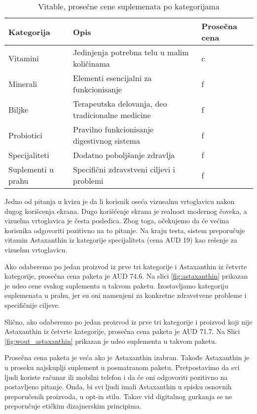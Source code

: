 \begin{table}[h!]
\small
\caption{Vitable, prosečne cene suplemenata po kategorijama}
\begin{tabular}{|l|l|l|} \hline
Kategorija& Opis & Prosečna cena\\ \hline
Vitamini &Jedinjenja potrebna telu u malim količinama&c\\ 
Minerali&Elementi esencijalni za funkcionisanje&f\\ 
Biljke&Terapeutska delovanja, deo tradicionalne medicine&f\\ 
Probiotici&Pravilno funkcionisanje digestivnog sistema&f\\ 
Specijaliteti&Dodatno poboljšanje zdravlja&f\\ 
Suplementi u prahu&Specifični zdravstveni ciljevi i problemi&f\\ \hline
\end{tabular}
\label{tab:vitablecene}
\end{table}
 Jedno od pitanja u kvizu je da li korisnik oseća vizuealnu vrtoglavicu nakon dugog korišcenja ekrana. Dugo korišćenje ekrana je realnost modernog čoveka, a vizuelna vrtoglavica je česta posledica. Zbog toga, očekujemo da će većina korisnika odgovoriti pozitivno na to pitanje. Na kraju testa, sistem preporučuje vitamin Astaxanthin iz kategorije specijaliteta (cena AUD 19) kao rešenje za vizuelnu vrtoglavicu. 

Ako odaberemo po jedan proizvod iz prve tri kategorije i Astaxanthin iz četvrte kategorije, prosečna cena paketa je AUD 74.6. Na slici \ref{fig:astaxanthin} prikazan je udeo cene svakog suplementa u takvom paketu. Izostavljamo kategoriju suplemenata u prahu, jer su oni namenjeni za konkretne zdravstvene probleme i specifičnije ciljeve. 

Slično, ako odaberemo po jedan proizvod iz prve tri kategorije i proizvod koji nije Astaxanthin iz četvrte kategorije, prosečna cena paketa je AUD 71.7. Na Slici \ref{fig:wout_astaxanthin} prikazan je udeo suplementa u takvom paketu.

Prosečna cena paketa je veća ako je Astaxanthin izabran. Takođe Astaxanthin je u proseku najskuplji suplement u posmatranom paketu. Pretpostavimo da svi ljudi koriste računar ili mobilni telefon i da će oni odgovoriti pozitivno na postavljeno pitanje. Onda, bi svi ljudi imali Astaxanthin u spisku osnovnih preporučenih proizvoda, u opt-in stilu. Takav vid digitalnog gurkanja se ne preporučuje etičkim dizajnerskim principima.

